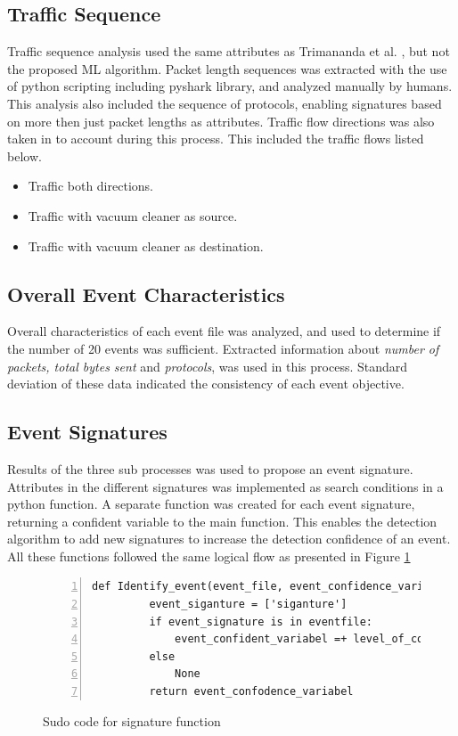 \subsection{Traffic Sequence}
Traffic sequence analysis used the same attributes as Trimananda et al.  \cite{pingpong_trimananda2020packet}, but not the proposed ML algorithm. Packet length sequences was extracted with the use of python scripting including pyshark library, and analyzed manually by humans. This analysis also included the sequence of protocols, enabling signatures based on more then just packet lengths as attributes. Traffic flow directions was also taken in to account during this process. This included the traffic flows listed below. 
  
\begin{itemize}
    \item Traffic both directions.
    \item Traffic with vacuum cleaner as source.
    \item Traffic with vacuum cleaner as destination.
\end{itemize}

\subsection{Overall Event Characteristics}
Overall characteristics of each event file was analyzed, and used to determine if the number of 20 events was sufficient. Extracted information about \textit{number of packets, total bytes sent} and \textit{protocols}, was used in this process. Standard deviation of these data indicated the consistency of each event objective. 

\subsection{Event Signatures}
Results of the three sub processes was used to propose an event signature. Attributes in the different signatures was implemented as search conditions in a python function. A separate function was created for each event signature, returning a confident variable to the main function. This enables the detection algorithm to add new signatures to increase the detection confidence of an event. All these functions followed the same logical flow as presented in Figure \ref{fig:Sudo_code_signature_function}

\begin{figure}[H]
    \centering
    \caption{Sudo code for signature function}
    \label{fig:Sudo_code_signature_function}
    \begin{lstlisting}[numbers=left]
     def Identify_event(event_file, event_confidence_variable):
         event_siganture = ['siganture']
         if event_signature is in eventfile:
             event_confident_variabel =+ level_of_confidece
         else
             None
         return event_confodence_variabel
    \end{lstlisting}
\end{figure}

